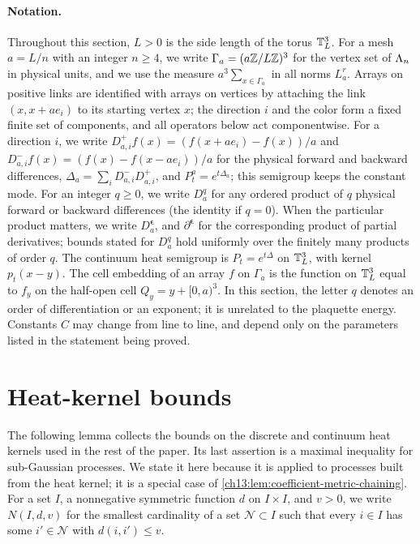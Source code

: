 \paragraph{Notation.}
Throughout this section, $L>0$ is the side length of the torus $\mathbb T_L^3$. For a mesh $a=L/n$ with an integer $n\ge4$, we write $\Gamma_a=(a\mathbb Z/L\mathbb Z)^3$ for the vertex set of $\Lambda_{n}$ in physical units, and we use the measure $a^3\sum_{x\in\Gamma_a}$ in all norms $L^r_a$. Arrays on positive links are identified with arrays on vertices by attaching the link $(x,x+ae_i)$ to its starting vertex $x$; the direction $i$ and the color form a fixed finite set of components, and all operators below act componentwise. For a direction $i$, we write $D_{a,i}^+f(x)=(f(x+ae_i)-f(x))/a$ and $D_{a,i}^-f(x)=(f(x)-f(x-ae_i))/a$ for the physical forward and backward differences, $\Delta_a=\sum_iD_{a,i}^-D_{a,i}^+$, and $P_t^a=e^{t\Delta_a}$; this semigroup keeps the constant mode. For an integer $q\ge0$, we write $D_a^q$ for any ordered product of $q$ physical forward or backward differences (the identity if $q=0$). When the particular product matters, we write $D_a^{\boldsymbol\epsilon}$, and $\partial^{\boldsymbol\epsilon}$ for the corresponding product of partial derivatives; bounds stated for $D_a^q$ hold uniformly over the finitely many products of order $q$. The continuum heat semigroup is $P_t=e^{t\Delta}$ on $\mathbb T_L^3$, with kernel $p_t(x-y)$. The cell embedding of an array $f$ on $\Gamma_a$ is the function on $\mathbb T_L^3$ equal to $f_y$ on the half-open cell $Q_y=y+[0,a)^3$. In this section, the letter $q$ denotes an order of differentiation or an exponent; it is unrelated to the plaquette energy. Constants $C$ may change from line to line, and depend only on the parameters listed in the statement being proved.

\section{Heat-kernel bounds}\label{ch13:sec:heat}

The following lemma collects the bounds on the discrete and continuum heat kernels used in the rest of the paper. Its last assertion is a maximal inequality for sub-Gaussian processes. We state it here because it is applied to processes built from the heat kernel; it is a special case of \cref{ch13:lem:coefficient-metric-chaining}. For a set $I$, a nonnegative symmetric function $d$ on $I\times I$, and $v>0$, we write $N(I,d,v)$ for the smallest cardinality of a set $\mathcal N\subset I$ such that every $i\in I$ has some $i'\in\mathcal N$ with $d(i,i')\le v$.

